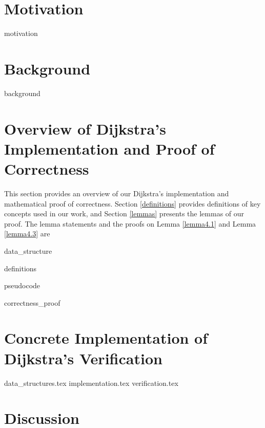 \documentclass[11pt, a4paper]{article} %
\theoremstyle{definition}
\begin{document}
\section{Motivation}
{motivation}

\section{Background}
{background}

\section{Overview of Dijkstra's Implementation and Proof of Correctness}
This section provides an overview of our Dijkstra's implementation and mathematical proof of correctness. Section \ref{definitions} provides definitions of key concepts used in our work, and Section \ref{lemmas} presents the lemmas of our proof. The lemma statements and the proofs on Lemma \ref{lemma4.1} and Lemma \ref{lemma4.3} are 

{data_structure}

{definitions}

{pseudocode}

{correctness_proof}


\section{Concrete Implementation of Dijkstra's Verification}
{data_structures.tex}
{implementation.tex}
{verification.tex}



\section{Discussion}
\end{document}
